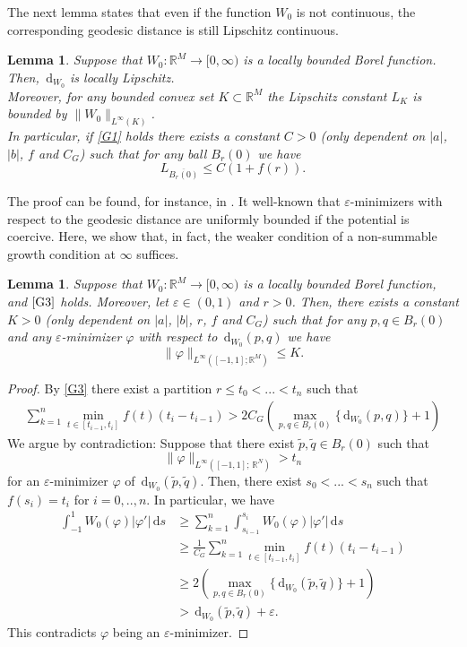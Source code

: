 \documentclass[a4paper, 11pt, reqno]{amsart}
\theoremstyle{plain}
\newtheorem{lemma}[theorem]{Lemma}
\theoremstyle{definition}
\theoremstyle{remark}
\newcommand{\R}{\mathbb R}
\newcommand{\eps}{\varepsilon}
\newcommand{\dd}{\,\mathrm{d}}
\begin{document}
The next lemma states that even if the function $W_0$ is not continuous, the corresponding geodesic distance is still Lipschitz continuous.

\begin{lemma}\label{lemma:geodesic_distance_is_locally_lipschitz}
    Suppose that $W_0: \R^M \to [0, \infty)$ is a locally bounded Borel function. Then, $\dd_{W_0}$ is locally Lipschitz. \\
    Moreover, for any bounded convex set $K \subset \R^M$ the Lipschitz constant $L_K$ is bounded by $\|W_0\|_{L^\infty(K)}$. \\
    In particular, if \ref{G1} holds there exists a constant $C > 0$ (only dependent on $|a|$, $|b|$, $f$ and $C_G$) such that for any ball $B_r(0)$ we have 
    \[
        L_{\overline{B_r(0)}} \leq C(1 + f(r)).
    \]
\end{lemma}
The proof can be found, for instance, in \cite[Lemma 2.7]{DeutschSolidSolid}. It well-known that $\eps$-minimizers with respect to the geodesic distance are uniformly bounded if the potential is coercive. Here, we show that, in fact, the weaker condition of a non-summable growth condition at $\infty$ suffices.
\begin{lemma}\label{lemma:eps_minimizers_are_bounded}
    Suppose that $W_0: \R^M \to [0, \infty)$ is a locally bounded Borel function, and $\ref{G3}$ holds. Moreover, let $\eps \in (0,1)$ and $r > 0$. Then, there exists a constant $K > 0$ (only dependent on $|a|$, $|b|$, $r$, $f$ and $C_G$) such that for any $p, q \in B_r(0)$ and any $\eps$-minimizer $\varphi$ with respect to $\dd_{W_0}(p,q)$ we have 
    \[
        \| \varphi \|_{L^\infty([-1,1];\R^M)} \leq K. 
    \]
\end{lemma}
\begin{proof}
    By \ref{G3} there exist a partition $r \leq t_0 < ... < t_n$ such that 
    \begin{align}\label{eq:correct_partition_choice}
        \sum_{k = 1}^n \min_{t \in [t_{i - 1}, t_i]}f(t) (t_i - t_{i - 1}) > 2C_G\left(\max_{p,q \in B_r(0)}\{\dd_{W_0}(p,q)\} + 1 \right)
    \end{align}
    We argue by contradiction: Suppose that there exist $\tilde p, \tilde q \in B_r(0)$ such that $$\| \varphi \|_{L^\infty([-1,1];\,  \R^N)} > t_n$$ for an $\eps$-minimizer $\varphi$ of $\dd_{W_0}(\tilde p, \tilde q)$. Then, there exist $s_0 < ... < s_n$ such that $f(s_i) = t_i$ for $i = 0,.., n$. In particular, we have
    \begin{align*}
        \int_{-1}^1 W_0(\varphi)|\varphi'|\,\mathrm{d}s &\geq \sum_{k = 1}^n \int_{s_{i-1}}^{s_i} W_0(\varphi)|\varphi'|\,\mathrm{d}s \\ 
        &\geq \frac{1}{C_G}\sum_{k = 1}^n \min_{t \in [t_{i - 1}, t_i]}f(t) (t_i - t_{i - 1}) \\
        &\geq 2\left(\max_{p,q \in B_r(0)}\{\dd_{W_0}(\tilde p, \tilde q)\} + 1 \right) \\
        &> \dd_{W_0}(\tilde p, \tilde q) + \eps.
    \end{align*}
    This contradicts $\varphi$ being an $\eps$-minimizer.
\end{proof}
\end{document}
